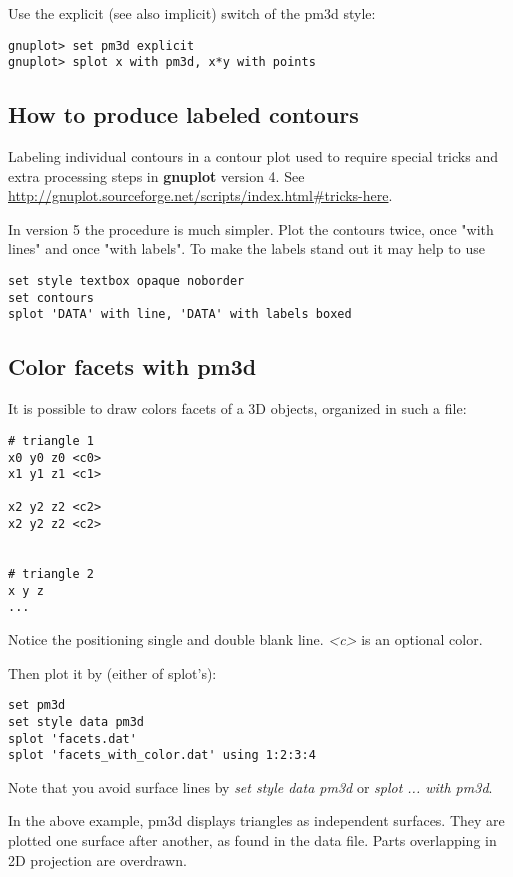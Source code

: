 \documentclass[a4paper,11pt]{article}
\def\http#1{{\small\href{http://#1}{\url{http://#1}}}}
\newcommand{\http}[1]%
            {\htmladdnormallink{\latex{\url{http://#1}}%
                    \html{\textit{http://#1}}}%
                {http://#1}%
            }
\newcommand{\gnuplot}{\textbf{gnuplot }}
\begin{document}
Use the explicit (see also implicit) switch of the pm3d style:
\small
\begin{verbatim}
gnuplot> set pm3d explicit
gnuplot> splot x with pm3d, x*y with points
\end{verbatim}
\normalsize


\subsection{How to produce labeled contours}

Labeling individual contours in a contour plot used to require special
tricks and extra processing steps in \gnuplot version 4.
See
\http{gnuplot.sourceforge.net/scripts/index.html\#tricks-here}.

In version 5 the procedure is much simpler.  Plot the contours twice,
once "with lines" and once "with labels".  To make the labels stand out
it may help to use 
\begin{verbatim}
set style textbox opaque noborder
set contours
splot 'DATA' with line, 'DATA' with labels boxed
\end{verbatim}

\subsection{Color facets with pm3d}

It is possible to draw colors facets of a 3D objects, organized in such a file:
\small
\begin{verbatim}
# triangle 1
x0 y0 z0 <c0>
x1 y1 z1 <c1>

x2 y2 z2 <c2>
x2 y2 z2 <c2>


# triangle 2
x y z
...
\end{verbatim}
\normalsize

Notice the positioning single and double blank line. \textit{<c>} is an optional
color.

Then plot it by (either of splot's):
\small
\begin{verbatim}
set pm3d
set style data pm3d
splot 'facets.dat'
splot 'facets_with_color.dat' using 1:2:3:4
\end{verbatim}
\normalsize

Note that you avoid surface lines by \textit{set style data pm3d} or 
\textit{splot ... with pm3d}.

In the above example, pm3d displays triangles as independent surfaces.
They are plotted one surface after another, as found in the data file.
Parts overlapping in 2D projection are overdrawn.
\end{document}
